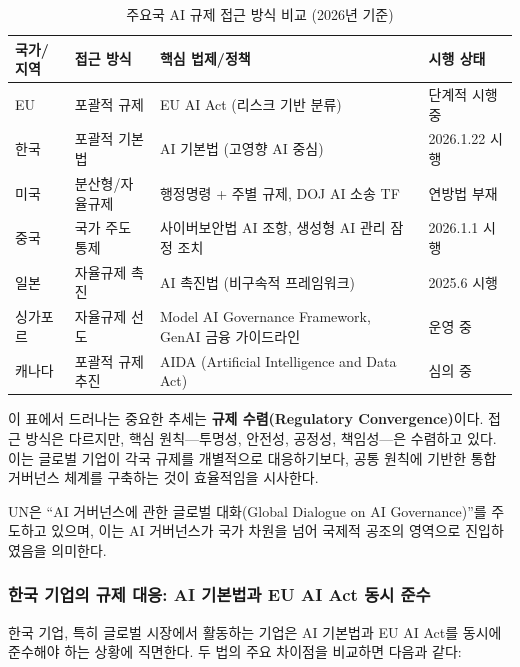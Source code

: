 \begin{table}[htbp]
\centering
\caption{주요국 AI 규제 접근 방식 비교 (2026년 기준)}
\label{tab:global_ai_regulation}
\begin{tabularx}{\textwidth}{|l|l|X|l|}
\hline
\textbf{국가/지역} & \textbf{접근 방식} & \textbf{핵심 법제/정책} & \textbf{시행 상태} \\ \hline
EU & 포괄적 규제 & EU AI Act (리스크 기반 분류) & 단계적 시행 중 \\ \hline
한국 & 포괄적 기본법 & AI 기본법 (고영향 AI 중심) & 2026.1.22 시행 \\ \hline
미국 & 분산형/자율규제 & 행정명령 + 주별 규제, DOJ AI 소송 TF & 연방법 부재 \\ \hline
중국 & 국가 주도 통제 & 사이버보안법 AI 조항, 생성형 AI 관리 잠정 조치 & 2026.1.1 시행 \\ \hline
일본 & 자율규제 촉진 & AI 촉진법 (비구속적 프레임워크) & 2025.6 시행 \\ \hline
싱가포르 & 자율규제 선도 & Model AI Governance Framework, GenAI 금융 가이드라인 & 운영 중 \\ \hline
캐나다 & 포괄적 규제 추진 & AIDA (Artificial Intelligence and Data Act) & 심의 중 \\ \hline
\end{tabularx}
\end{table}

이 표에서 드러나는 중요한 추세는 \textbf{규제 수렴(Regulatory Convergence)}이다. 접근 방식은 다르지만, 핵심 원칙---투명성, 안전성, 공정성, 책임성---은 수렴하고 있다. 이는 글로벌 기업이 각국 규제를 개별적으로 대응하기보다, 공통 원칙에 기반한 통합 거버넌스 체계를 구축하는 것이 효율적임을 시사한다.

UN은 ``AI 거버넌스에 관한 글로벌 대화(Global Dialogue on AI Governance)''를 주도하고 있으며, 이는 AI 거버넌스가 국가 차원을 넘어 국제적 공조의 영역으로 진입하였음을 의미한다.

\subsubsection*{한국 기업의 규제 대응: AI 기본법과 EU AI Act 동시 준수}

한국 기업, 특히 글로벌 시장에서 활동하는 기업은 AI 기본법과 EU AI Act를 동시에 준수해야 하는 상황에 직면한다. 두 법의 주요 차이점을 비교하면 다음과 같다:

